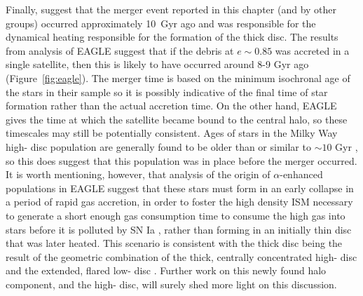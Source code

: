 Finally, \citet{2018arXiv180606038H} suggest that the merger
event reported in this chapter (and by other groups) occurred
approximately 10~Gyr ago and was responsible for the dynamical
heating responsible for the formation of the thick disc. The results
from analysis of EAGLE suggest that if the debris at $e \sim 0.85$
was accreted in a single satellite, then this is likely to have
occurred around 8-9 Gyr ago (Figure~\ref{fig:eagle}).  The
\citet{2018arXiv180606038H} merger time is based on the minimum
isochronal age of the stars in their sample so it is possibly
indicative of the final time of star formation rather than the
actual accretion time.  On the other hand, EAGLE gives the time at
which the satellite became bound to the central halo, so these
timescales may still be potentially consistent.  Ages of stars in the Milky
Way high-\afe{} disc population are generally found to be older
than or similar to $\sim 10$ Gyr
\citep[e.g.][]{2013A&A...560A.109H,2016MNRAS.456.3655M,2017arXiv170600018M},
so this does suggest that this population was in place before the
merger occurred. It is worth mentioning, however, that analysis of
the origin of $\alpha$-enhanced populations in EAGLE suggest that
these stars must form in an early collapse in a period of rapid gas
accretion, in order to foster the high density ISM necessary to
generate a short enough gas consumption time to consume the high
\afe{} gas into stars before it is polluted by SN Ia
\citep{2018MNRAS.477.5072M}, rather than forming in an
initially thin disc that was later heated. This scenario is
consistent with the thick disc being the result of the geometric
combination of the thick, centrally concentrated high-\afe{} disc
and the extended, flared low-\afe{} disc
\citep[e.g][]{2017arXiv170600018M,2016arXiv160901168M,2015ApJ...804L...9M}.
Further work on this newly found halo component, and the high-\afe{}
disc, will surely shed more light on this discussion.






